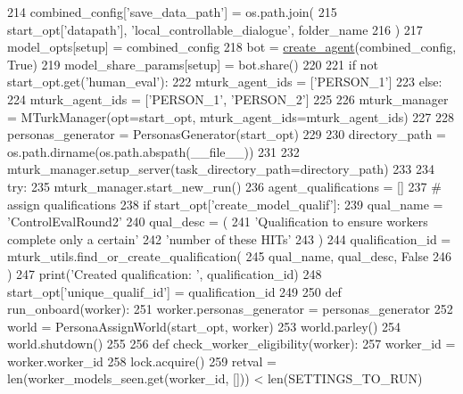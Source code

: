 \begin{DoxyCode}
{{{{214         combined\_config[\textcolor{stringliteral}{'save\_data\_path'}] = os.path.join(
215             start\_opt[\textcolor{stringliteral}{'datapath'}], \textcolor{stringliteral}{'local\_controllable\_dialogue'}, folder\_name
216         )
217         model\_opts[setup] = combined\_config
218         bot = \hyperlink{namespaceparlai_1_1core_1_1agents_a00d77a7e26fb89e8bd900f7b2a02982a}{create\_agent}(combined\_config, \textcolor{keyword}{True})
219         model\_share\_params[setup] = bot.share()
220 
221     \textcolor{keywordflow}{if} \textcolor{keywordflow}{not} start\_opt.get(\textcolor{stringliteral}{'human\_eval'}):
222         mturk\_agent\_ids = [\textcolor{stringliteral}{'PERSON\_1'}]
223     \textcolor{keywordflow}{else}:
224         mturk\_agent\_ids = [\textcolor{stringliteral}{'PERSON\_1'}, \textcolor{stringliteral}{'PERSON\_2'}]
225 
226     mturk\_manager = MTurkManager(opt=start\_opt, mturk\_agent\_ids=mturk\_agent\_ids)
227 
228     personas\_generator = PersonasGenerator(start\_opt)
229 
230     directory\_path = os.path.dirname(os.path.abspath(\_\_file\_\_))
231 
232     mturk\_manager.setup\_server(task\_directory\_path=directory\_path)
233 
234     \textcolor{keywordflow}{try}:
235         mturk\_manager.start\_new\_run()
236         agent\_qualifications = []
237         \textcolor{comment}{# assign qualifications}
238         \textcolor{keywordflow}{if} start\_opt[\textcolor{stringliteral}{'create\_model\_qualif'}]:
239             qual\_name = \textcolor{stringliteral}{'ControlEvalRound2'}
240             qual\_desc = (
241                 \textcolor{stringliteral}{'Qualification to ensure workers complete only a certain'}
242                 \textcolor{stringliteral}{'number of these HITs'}
243             )
244             qualification\_id = mturk\_utils.find\_or\_create\_qualification(
245                 qual\_name, qual\_desc, \textcolor{keyword}{False}
246             )
247             print(\textcolor{stringliteral}{'Created qualification: '}, qualification\_id)
248             start\_opt[\textcolor{stringliteral}{'unique\_qualif\_id'}] = qualification\_id
249 
250         \textcolor{keyword}{def }run\_onboard(worker):
251             worker.personas\_generator = personas\_generator
252             world = PersonaAssignWorld(start\_opt, worker)
253             world.parley()
254             world.shutdown()
255 
256         \textcolor{keyword}{def }check\_worker\_eligibility(worker):
257             worker\_id = worker.worker\_id
258             lock.acquire()
259             retval = len(worker\_models\_seen.get(worker\_id, [])) < len(SETTINGS\_TO\_RUN)
}}}}
\end{DoxyCode}
